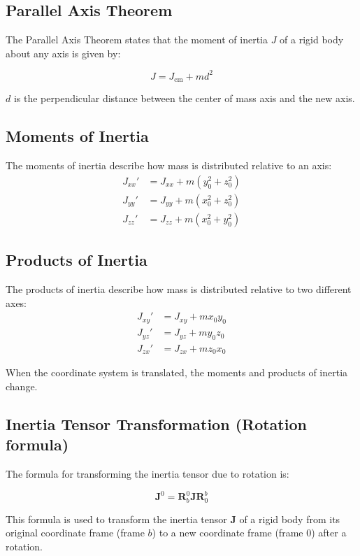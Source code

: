 \subsection{Parallel Axis Theorem}
The Parallel Axis Theorem states that the moment of inertia \(J\) of a rigid body about any axis is given by:

\[
J = J_{\text{cm}} + m d^2
\]

$d$ is the perpendicular distance between the center of mass axis and the new axis.

\subsection{Moments of Inertia}
The moments of inertia describe how mass is distributed relative to an axis:
\begin{align*}
    J_{xx}' &= J_{xx} + m (y_0^2 + z_0^2) \\
    J_{yy}' &= J_{yy} + m (x_0^2 + z_0^2) \\
    J_{zz}' &= J_{zz} + m (x_0^2 + y_0^2)
\end{align*}

\subsection{Products of Inertia}
The products of inertia describe how mass is distributed relative to two different axes:
\begin{align*}
    J_{xy}' &= J_{xy} + m x_0 y_0 \\
    J_{yz}' &= J_{yz} + m y_0 z_0 \\
    J_{zx}' &= J_{zx} + m z_0 x_0
\end{align*}

When the coordinate system is translated, the moments and products of inertia change.

\subsection{Inertia Tensor Transformation (Rotation formula)}

The formula for transforming the inertia tensor due to rotation is:

\[ \mathbf{J}^0 = \mathbf{R}^0_b \mathbf{J} \mathbf{R}^b_0 \]

This formula is used to transform the inertia tensor \(\mathbf{J}\) of a rigid body from its original coordinate frame (frame \(b\)) to a new coordinate frame (frame \(0\)) after a rotation.


